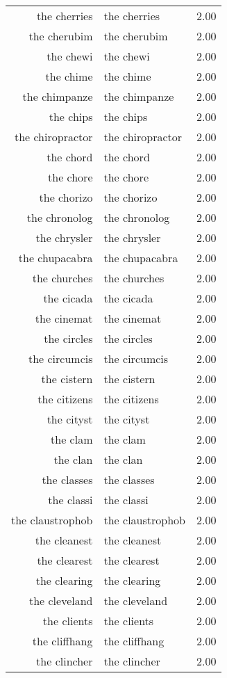 \begin{table}[ht]
\begin{tabular}{rlr}
  the cherries & the cherries & 2.00 \\ 
  the cherubim & the cherubim & 2.00 \\ 
  the chewi & the chewi & 2.00 \\ 
  the chime & the chime & 2.00 \\ 
  the chimpanze & the chimpanze & 2.00 \\ 
  the chips & the chips & 2.00 \\ 
  the chiropractor & the chiropractor & 2.00 \\ 
  the chord & the chord & 2.00 \\ 
  the chore & the chore & 2.00 \\ 
  the chorizo & the chorizo & 2.00 \\ 
  the chronolog & the chronolog & 2.00 \\ 
  the chrysler & the chrysler & 2.00 \\ 
  the chupacabra & the chupacabra & 2.00 \\ 
  the churches & the churches & 2.00 \\ 
  the cicada & the cicada & 2.00 \\ 
  the cinemat & the cinemat & 2.00 \\ 
  the circles & the circles & 2.00 \\ 
  the circumcis & the circumcis & 2.00 \\ 
  the cistern & the cistern & 2.00 \\ 
  the citizens & the citizens & 2.00 \\ 
  the cityst & the cityst & 2.00 \\ 
  the clam & the clam & 2.00 \\ 
  the clan & the clan & 2.00 \\ 
  the classes & the classes & 2.00 \\ 
  the classi & the classi & 2.00 \\ 
  the claustrophob & the claustrophob & 2.00 \\ 
  the cleanest & the cleanest & 2.00 \\ 
  the clearest & the clearest & 2.00 \\ 
  the clearing & the clearing & 2.00 \\ 
  the cleveland & the cleveland & 2.00 \\ 
  the clients & the clients & 2.00 \\ 
  the cliffhang & the cliffhang & 2.00 \\ 
  the clincher & the clincher & 2.00 \\ 

\end{tabular}
\end{table}
